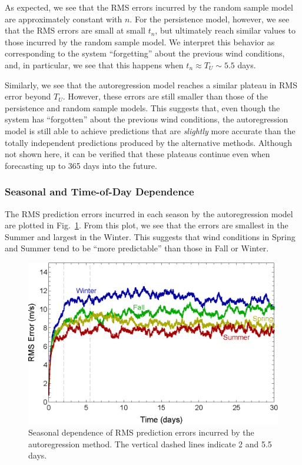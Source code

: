 \documentclass[11pt, oneside]{article}
\newcommand{\figref}[1]{Fig.~\ref{#1}}
\begin{document}
As expected, we see that the RMS errors incurred by the random sample model are approximately constant with $n$.
For the persistence model, however, we see that the RMS errors are small at small $t_n$, but ultimately reach similar values to those incurred by the random sample model.
We interpret this behavior as corresponding to the system ``forgetting'' about the previous wind conditions, and, in particular, we see that this happens when $t_n \approx T_U \sim 5.5$ days.

Similarly, we see that the autoregression model reaches a similar plateau in RMS error beyond $T_U$.
However, these errors are still smaller than those of the persistence and random sample models.
This suggests that, even though the system has ``forgotten'' about the previous wind conditions, the autoregression model is still able to achieve predictions that are \textit{slightly} more accurate than the totally independent predictions produced by the alternative methods.
Although not shown here, it can be verified that these plateaus continue even when forecasting up to 365 days into the future. %

\subsubsection{Seasonal and Time-of-Day Dependence}
The RMS prediction errors incurred in each season by the autoregression model are plotted in \figref{fig:SeasonalRMS}.
From this plot, we see that the errors are smallest in the Summer and largest in the Winter.
This suggests that wind conditions in Spring and Summer tend to be ``more predictable'' than those in Fall or Winter. %

\begin{figure}[htb]
\centering
\includegraphics[width=0.7\columnwidth]{figures/SeasonalRMSPredictionError}
\caption{Seasonal dependence of RMS prediction errors incurred by the autoregression method.
The vertical dashed lines indicate 2 and 5.5 days.}
\label{fig:SeasonalRMS}
\end{figure}
\end{document}
